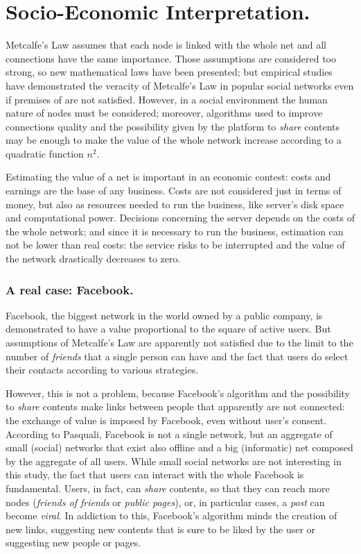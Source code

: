 \documentclass[12pt, a4page]{article}
\begin{document}
\newpage
\part*{Socio-Economic Interpretation.}
Metcalfe's Law assumes that each node is linked with the whole net and all connections have the same importance.
Those assumptions are considered too strong, so new mathematical laws have been presented; but empirical studies have demonstrated the veracity of Metcalfe's Law in popular social networks\cite{Metcalfe}\cite{Wechat} even if premises of are not satisfied.
However, in a social environment the human nature of nodes must be considered; moreover, algorithms used to improve connections quality and the possibility given by the platform to \textit{share} contents may be enough to make the value of the whole network increase according to a quadratic function $n^2$. \newline

Estimating the value of a net is important in an economic contest: costs and earnings are the base of any business. Costs are not considered just in terms of money, but also as resources needed to run the business, like server's disk space and computational power.
Decisions concerning the server depends on the costs of the whole network; and since it is necessary to run the business, estimation can not be lower than real costs: the service risks to be interrupted and the value of the network drastically decreases to zero. \newline

\section{A real case: Facebook.}
Facebook, the biggest network in the world owned by a public company, is demonstrated to have a value proportional to the square of active users\cite{Metcalfe}\cite{Wechat}.
But assumptions of Metcalfe's Law are apparently not satisfied due to the limit to the number of \textit{friends} that a single person can have and the fact that users do select their contacts according to various strategies\cite{Socialmedia}. \newline

However, this is not a problem, because Facebook's algorithm and the possibility to \textit{share} contents make links between people that apparently are not connected: the exchange of value is imposed by Facebook, even without user's consent.
According to Pasquali\cite{Socialmedia}, Facebook is not a single network, but an aggregate of small (social) networks that exist also offline and a big (informatic) net composed by the aggregate of all users.
While small social networks are not interesting in this study, the fact that users can interact with the whole Facebook is fundamental.
Users, in fact, can \textit{share} contents, so that they can reach more nodes (\textit{friends of friends} or \textit{public pages}), or, in particular cases, a \textit{post} can become \textit{viral}.
In addiction to this, Facebook's algorithm minds the creation of new links, suggesting new contents that is sure to be liked by the user or suggesting new people or pages.
\end{document}
